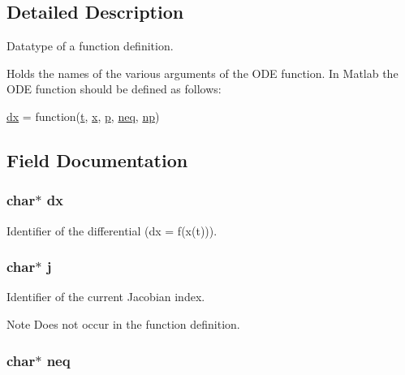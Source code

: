 \subsection{Detailed Description}
Datatype of a function definition. 

Holds the names of the various arguments of the O\-D\-E function. In Matlab the O\-D\-E function should be defined as follows\-: 
\begin{DoxyCode}
\hyperlink{structFunc_aa66668aed9b94cfd43d1d5fcad8e923d}{dx} = \textcolor{keyword}{function}(\hyperlink{structFunc_a21feba301403a65090791a94f26c9d92}{t}, \hyperlink{structFunc_a87d9da60be62fb1a74b56404c392bf74}{x}, \hyperlink{structFunc_aaa1ebe818ec1c763a776cc580551f3e6}{p}, \hyperlink{structFunc_a26607bec2385a751e572c5aa9976262d}{neq}, \hyperlink{structFunc_ac5e9e8f42513fbf549dcde4107b633d0}{np})
\end{DoxyCode}
 

\subsection{Field Documentation}
\hypertarget{structFunc_aa66668aed9b94cfd43d1d5fcad8e923d}{
\subsubsection[{dx}]{\setlength{\rightskip}{0pt plus 5cm}char$\ast$ dx}}\label{structFunc_aa66668aed9b94cfd43d1d5fcad8e923d}


Identifier of the differential (dx = f(x(t))). 

\hypertarget{structFunc_aabe3f0c55a8ab8de92abb1da25c055db}{
\subsubsection[{j}]{\setlength{\rightskip}{0pt plus 5cm}char$\ast$ j}}\label{structFunc_aabe3f0c55a8ab8de92abb1da25c055db}


Identifier of the current Jacobian index. 

\begin{DoxyNote}{Note}
Does not occur in the function definition. 
\end{DoxyNote}
\hypertarget{structFunc_a26607bec2385a751e572c5aa9976262d}{
\subsubsection[{neq}]{\setlength{\rightskip}{0pt plus 5cm}char$\ast$ neq}}\label{structFunc_a26607bec2385a751e572c5aa9976262d}


